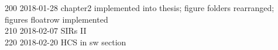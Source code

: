 \begin{titlepage}
\begin{footnotesize}
200	2018-01-28	chapter2 implemented into thesis; figure folders rearranged; figures floatrow implemented\\
210	2018-02-07	SIRs II\\
220	2018-02-20	HCS in sw section\\

\end{footnotesize}
\end{titlepage}
